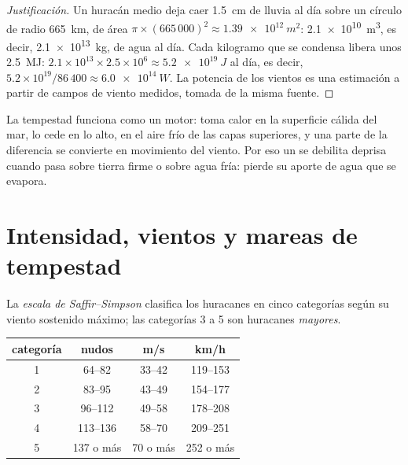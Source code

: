 \begin{proof}[Justificación]
Un huracán medio deja caer \qty{1.5}{cm} de lluvia al día sobre un círculo
de radio \qty{665}{km}, de área $\pi \times (665\,000)^2 \approx
\qty{1.39e12}{m^2}$: \qty{2.1e10}{m^3}, es decir, \qty{2.1e13}{kg}, de agua
al día. Cada kilogramo que se condensa libera unos \qty{2.5}{MJ}:
$2.1\times10^{13}
\times 2.5\times10^6 \approx \qty{5.2e19}{J}$ al día, es
decir, $5.2\times10^{19}/86\,400 \approx \qty{6.0e14}{W}$. La potencia de los
vientos es una estimación a partir de campos de viento medidos, tomada de la
misma fuente.
\end{proof}

La tempestad funciona como un motor: toma calor en la superficie cálida del
mar, lo cede en lo alto, en el aire frío de las capas superiores, y una
parte de la diferencia se convierte en movimiento del viento. Por eso un
 se debilita deprisa cuando pasa sobre tierra firme o sobre
agua fría: pierde su aporte de agua que se evapora.

\section{Intensidad, vientos y mareas de tempestad}

\begin{definition}\label{def:g10:storms-and-cyclones:scale}
La \emph{escala de Saffir--Simpson}
clasifica los huracanes en cinco categorías según su viento sostenido
máximo; las categorías 3 a 5 son huracanes \emph{mayores}.
\end{definition}

\begin{center}
\small
\begin{tabular}{cccc}
\hline
categoría & nudos & \unit{m/s} & \unit{km/h} \\
\hline
1 & 64--82 & 33--42 & 119--153 \\
2 & 83--95 & 43--49 & 154--177 \\
3 & 96--112 & 49--58 & 178--208 \\
4 & 113--136 & 58--70 & 209--251 \\
5 & 137 o más & 70 o más & 252 o más \\
\hline
\end{tabular}
\end{center}

